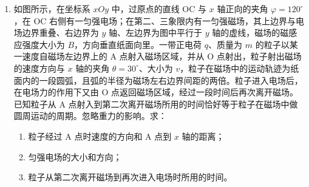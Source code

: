\documentclass[\gkver]{gaokaozhenti}
\begin{document}
\begin{enumerate}
{（2）小球释放到第一次到达最低点的过程中，设绳的拉力对小球做功的大小为 $W$，对小球由动能定理：$mgl+W=\frac{1}{2}mv_{1}^{2}$ ⑤。联立①②⑤解得 $W=-\frac{1}{2}mgl$，即绳的拉力对小球做负功，大小为 $\frac{1}{2}mgl$。
}

\item
如图所示，在坐标系 $xOy$ 中，过原点的直线 OC 与 $x$ 轴正向的夹角 $\varphi=120^{\circ}$，在 OC 右侧有一匀强电场；在第二、三象限内有一匀强磁场，其上边界与电场边界重叠、右边界为 $y$ 轴、左边界为图中平行于 $y$ 轴的虚线，磁场的磁感应强度大小为 $B$，方向垂直纸面向里。一带正电荷 $q$、质量为 $m$ 的粒子以某一速度自磁场左边界上的 A 点射入磁场区域，并从 O 点射出，粒子射出磁场的速度方向与 $x$ 轴的夹角 $\theta=30^{\circ}$、大小为 $v$，粒子在磁场中的运动轨迹为纸面内的一段圆弧，且弧的半径为磁场左右边界间距的两倍。粒子进入电场后，在电场力的作用下又由 O 点返回磁场区域，经过一段时间后再次离开磁场。已知粒子从 A 点射入到第二次离开磁场所用的时间恰好等于粒子在磁场中做圆周运动的周期。忽略重力的影响。求：

\begin{enumerate}
	\item
	粒子经过 A 点时速度的方向和 A 点到 $x$ 轴的距离；
	\item
	匀强电场的大小和方向；
	\item
	粒子从第二次离开磁场到再次进入电场时所用的时间。
\end{enumerate}



\end{enumerate}
\end{document}
